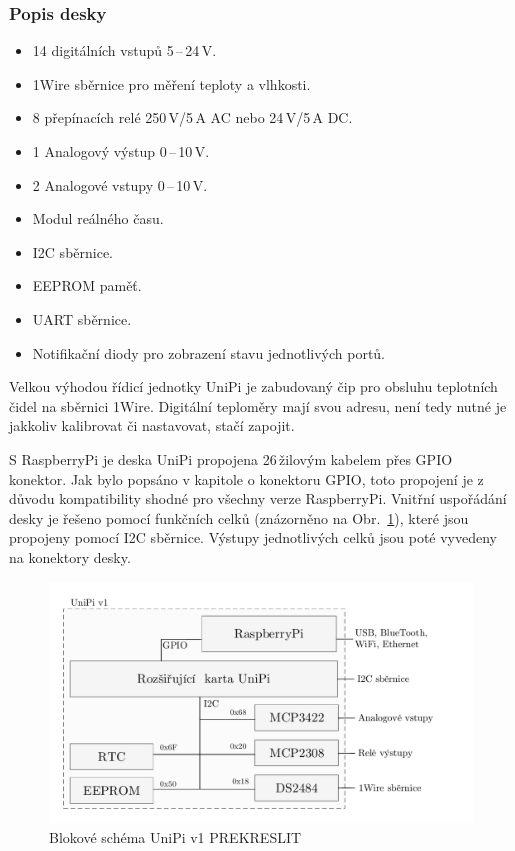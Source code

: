 \subsubsection{Popis desky}
\begin{itemize}
	\item 14 digitálních vstupů 5\,–\,24\,V. 
	\item 1Wire sběrnice pro měření teploty a vlhkosti. 
	\item 8 přepínacích relé 250\,V/5\,A AC nebo 24\,V/5\,A DC.
	\item 1 Analogový výstup 0\,–\,10\,V.
	\item 2 Analogové vstupy 0\,–\,10\,V.
	\item Modul reálného času.
	\item I2C sběrnice.
	\item EEPROM paměť.
	\item UART sběrnice.
	\item Notifikační diody pro zobrazení stavu jednotlivých portů.
\end{itemize}

Velkou výhodou řídicí jednotky UniPi je zabudovaný čip pro obsluhu teplotních čidel na sběrnici 1Wire. Digitální teploměry mají svou adresu, není tedy nutné je jakkoliv kalibrovat či nastavovat, stačí zapojit.

S RaspberryPi je deska UniPi propojena 26\,žilovým kabelem přes GPIO konektor. Jak bylo popsáno v kapitole o konektoru GPIO, toto propojení je z důvodu kompatibility shodné pro všechny verze RaspberryPi. Vnitřní uspořádání desky je řešeno pomocí funkčních celků  (znázorněno na Obr.~\ref{SchemaBlok1}), které jsou propojeny pomocí I2C sběrnice. Výstupy jednotlivých celků jsou poté vyvedeny na konektory desky.
 \begin{figure}[!ht]
  \begin{center}
    \includegraphics[scale=0.7]{obrazky/unipi_schema1}
  \end{center}
  \caption{Blokové schéma UniPi v1 \colorbox[rgb]{1,0,0}{PREKRESLIT}}
	\label{SchemaBlok1}
\end{figure}

